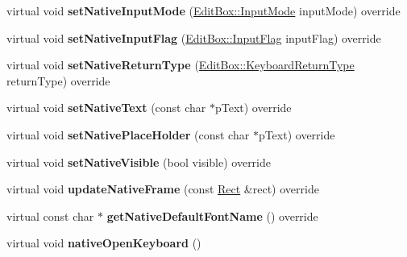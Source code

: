 \begin{DoxyCompactItemize}
virtual void {\bfseries set\+Native\+Input\+Mode} (\hyperlink{classui_1_1EditBox_a7a1bfe8f3ba218bedfcf5451ec3ce01a}{Edit\+Box\+::\+Input\+Mode} input\+Mode) override
\item 
\mbox{\label{classui_1_1UIEditBoxImplWinrt_af5e58b873deff37220a18ad12c0b71e9}} 
virtual void {\bfseries set\+Native\+Input\+Flag} (\hyperlink{classui_1_1EditBox_af02f13ee9fba51d59bb3111e200848c8}{Edit\+Box\+::\+Input\+Flag} input\+Flag) override
\item 
\mbox{\label{classui_1_1UIEditBoxImplWinrt_af060b6f0a33fda30e9a154988940521c}} 
virtual void {\bfseries set\+Native\+Return\+Type} (\hyperlink{classui_1_1EditBox_a1e1285b6f742975b26bdeb8108ca6e51}{Edit\+Box\+::\+Keyboard\+Return\+Type} return\+Type) override
\item 
\mbox{\label{classui_1_1UIEditBoxImplWinrt_abd21fbdd8e2901924d1b7d8c864bce3e}} 
virtual void {\bfseries set\+Native\+Text} (const char $\ast$p\+Text) override
\item 
\mbox{\label{classui_1_1UIEditBoxImplWinrt_a105a79c79802612715ed697e70a48d6a}} 
virtual void {\bfseries set\+Native\+Place\+Holder} (const char $\ast$p\+Text) override
\item 
\mbox{\label{classui_1_1UIEditBoxImplWinrt_a2761b8ab1df1283c5b9983ad2a957d74}} 
virtual void {\bfseries set\+Native\+Visible} (bool visible) override
\item 
\mbox{\label{classui_1_1UIEditBoxImplWinrt_a229a5cb4066426739305d97a3d87dd35}} 
virtual void {\bfseries update\+Native\+Frame} (const \hyperlink{classRect}{Rect} \&rect) override
\item 
\mbox{\label{classui_1_1UIEditBoxImplWinrt_a19322f08de4e665ab8a9a6b8b9d4e192}} 
virtual const char $\ast$ {\bfseries get\+Native\+Default\+Font\+Name} () override
\item 
\mbox{\label{classui_1_1UIEditBoxImplWinrt_a42d14d5115d85512ef3d5a4e9a14469d}} 
virtual void {\bfseries native\+Open\+Keyboard} ()

\end{DoxyCompactItemize}
